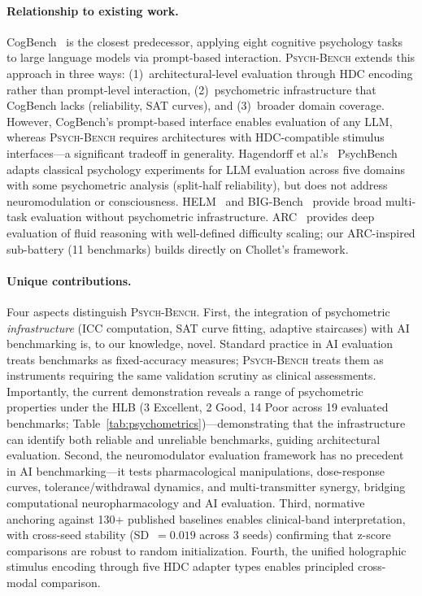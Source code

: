 \documentclass[11pt,letterpaper]{article}
\newcommand{\psychbench}{\textsc{Psych-Bench}}
\newcommand{\hlb}{\textsc{HLB}}
\begin{document}
\paragraph{Relationship to existing work.} CogBench~\citep{codaforno2024cogbench} is the closest predecessor, applying eight cognitive psychology tasks to large language models via prompt-based interaction. \psychbench{} extends this approach in three ways: (1)~architectural-level evaluation through HDC encoding rather than prompt-level interaction, (2)~psychometric infrastructure that CogBench lacks (reliability, SAT curves), and (3)~broader domain coverage. However, CogBench's prompt-based interface enables evaluation of any LLM, whereas \psychbench{} requires architectures with HDC-compatible stimulus interfaces---a significant tradeoff in generality. Hagendorff et al.'s~\citep{hagendorff2023machine} PsychBench adapts classical psychology experiments for LLM evaluation across five domains with some psychometric analysis (split-half reliability), but does not address neuromodulation or consciousness. HELM~\citep{liang2023holistic} and BIG-Bench~\citep{srivastava2023beyond} provide broad multi-task evaluation without psychometric infrastructure. ARC~\citep{chollet2019measure} provides deep evaluation of fluid reasoning with well-defined difficulty scaling; our ARC-inspired sub-battery (11 benchmarks) builds directly on Chollet's framework.

\paragraph{Unique contributions.} Four aspects distinguish \psychbench{}. First, the integration of psychometric \emph{infrastructure} (ICC computation, SAT curve fitting, adaptive staircases) with AI benchmarking is, to our knowledge, novel. Standard practice in AI evaluation treats benchmarks as fixed-accuracy measures; \psychbench{} treats them as instruments requiring the same validation scrutiny as clinical assessments. Importantly, the current demonstration reveals a range of psychometric properties under the \hlb{} (3 Excellent, 2 Good, 14 Poor across 19 evaluated benchmarks; Table~\ref{tab:psychometrics})---demonstrating that the infrastructure can identify both reliable and unreliable benchmarks, guiding architectural evaluation. Second, the neuromodulator evaluation framework has no precedent in AI benchmarking---it tests pharmacological manipulations, dose-response curves, tolerance/withdrawal dynamics, and multi-transmitter synergy, bridging computational neuropharmacology and AI evaluation. Third, normative anchoring against 130+ published baselines enables clinical-band interpretation, with cross-seed stability (SD~$= 0.019$ across 3 seeds) confirming that z-score comparisons are robust to random initialization. Fourth, the unified holographic stimulus encoding through five HDC adapter types enables principled cross-modal comparison.
\end{document}
